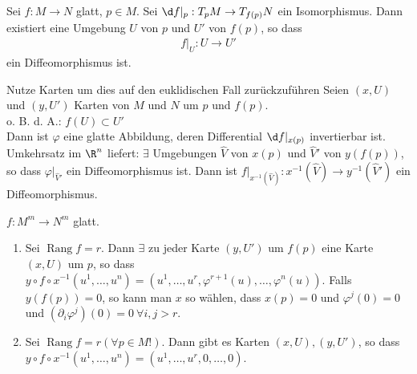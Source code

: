 \begin{satz}[Umkehrsatz]
Sei $f: M \rightarrow N$ glatt, $p\in M$. Sei $\d f\vert_p: T_p M\rightarrow T_{f(p)} N$ ein Isomorphismus. Dann existiert eine Umgebung $U$ von $p$ und $U'$ von $f(p)$, so dass
\begin{align*}
f\vert_U: U \rightarrow U'
\end{align*}
ein Diffeomorphismus ist.
\end{satz}

\begin{bew}
Nutze Karten um dies auf den euklidischen Fall zurückzuführen
Seien $(x, U)$ und $(y, U')$ Karten von $M$ und $N$ um $p$ und $f(p)$.\\
o. B. d. A.: $f(U) \subset U'$\\
Dann ist $\varphi$ eine glatte Abbildung, deren Differential $\d f\vert_{x(p)}$ invertierbar ist.\\ 
Umkehrsatz im $\R^n$ liefert: $\exists$ Umgebungen  $\hat{V}$ von $x(p)$ und $\hat{V}'$ von $y(f(p))$, so dass $\varphi\vert_{\hat{V}'}$ ein Diffeomorphismus ist. Dann ist $f\vert_{x^{-1}(\hat{V})}: x^{-1}(\hat{V}) \rightarrow y^{-1}(\hat{V}')$ ein Diffeomorphismus.
\end{bew}

\begin{satz}
$f:M^m \rightarrow N^m$ glatt.
\begin{enumerate}
\item Sei $\operatorname{Rang} f = r$. Dann $\exists$ zu jeder Karte $(y, U')$ um $f(p)$ eine Karte $(x, U)$ um $p$, so dass\linebreak \mbox{$y\circ f\circ x^{-1}(u^1, \dots, u^n) = (u^1, \dots, u^r, \varphi^{r+1}(u), \dots, \varphi^n(u))$}.
Falls $y(f(p)) = 0$, so kann man $x$ so wählen, dass $x(p) = 0$ und $\varphi^j(0) = 0$ und $(\partial_i \varphi^j)(0) = 0\ \forall i, j > r$.
\item Sei $\operatorname{Rang	}f = r (\forall p \in M!)$. Dann gibt es Karten $(x, U), (y, U')$, so dass\linebreak \mbox{$y\circ f\circ x^{-1}(u^1, \dots, u^n) = (u^1, \dots, u^r, 0, \dots, 0)$}.
\end{enumerate}
\end{satz}

